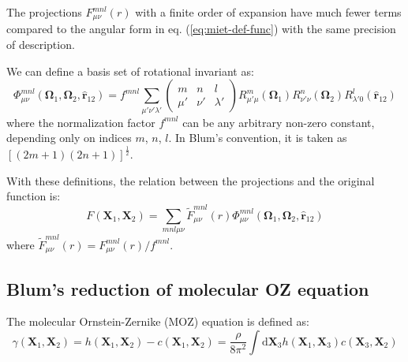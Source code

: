 The projections $F_{\mu\nu}^{mnl}(r)$ with a finite order of expansion
have much fewer terms compared to the angular form in eq. (\ref{eq:miet-def-func})
with the same precision of description.

We can define a basis set of rotational invariant as:
\begin{equation}
\Phi_{\mu\nu}^{mnl}(\mathbf{\Omega}_{1},\mathbf{\Omega}_{2},\mathbf{\hat{r}}_{12})=f^{mnl}\sum_{\mu'\nu'\lambda'}\left(\begin{array}{ccc}
m & n & l\\
\mu' & \nu' & \lambda'
\end{array}\right)R_{\mu'\mu}^{m}(\mathbf{\Omega}_{1})R_{\nu'\nu}^{n}(\mathbf{\Omega}_{2})R_{\lambda'0}^{l}(\mathbf{\hat{r}}_{12})
\end{equation}
where the normalization factor $f^{mnl}$ can be any arbitrary non-zero
constant, depending only on indices $m$, $n$, $l$. In Blum's convention,
it is taken as $\left[\left(2m+1\right)\left(2n+1\right)\right]^{\frac{1}{2}}$.

With these definitions, the relation between the projections and the original
function is:
\begin{equation}
F(\mathbf{X}_{1},\mathbf{X}_{2})=\sum_{mnl\mu\nu}\tilde{F}_{\mu\nu}^{mnl}(r)\Phi_{\mu\nu}^{mnl}(\mathbf{\Omega}_{1},\mathbf{\Omega}_{2},\mathbf{\hat{r}}_{12})
\end{equation}
where $\tilde{F}_{\mu\nu}^{mnl}(r)=F_{\mu\nu}^{mnl}(r)/f^{mnl}$.

\subsection{Blum's reduction of molecular OZ equation}

The molecular Ornstein-Zernike (\acs{MOZ}) equation is defined as:
\begin{equation}
\gamma(\mathbf{X}_{1},\mathbf{X}_{2})=h(\mathbf{X}_{1},\mathbf{X}_{2})-c(\mathbf{X}_{1},\mathbf{X}_{2})=\frac{\rho}{8\pi^{2}}\int\mathrm{d}\mathbf{X}_{3}h(\mathbf{X}_{1},\mathbf{X}_{3})c(\mathbf{X}_{3},\mathbf{X}_{2})\label{eq:4.MOZ}
\end{equation}

